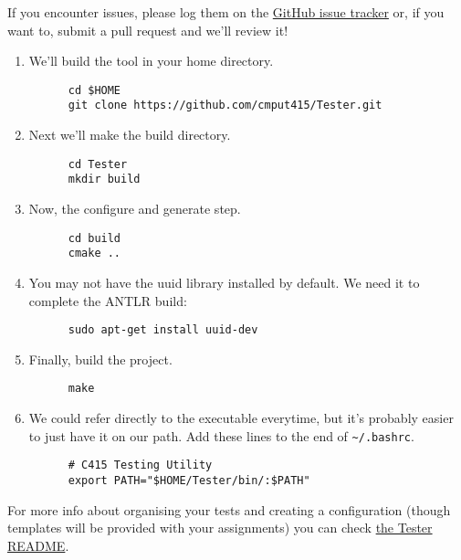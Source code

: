 \documentclass[../setup.tex]{subfiles}
\begin{document}
If you encounter issues, please log them on the \href{https://github.com/cmput415/Tester/issues}
{GitHub issue tracker} or, if you want to, submit a pull request and we'll review it!
\begin{enumerate}
  \item
    We'll build the tool in your home directory.
    \begin{lstlisting}
      cd $HOME
      git clone https://github.com/cmput415/Tester.git
    \end{lstlisting}
  \item
    Next we'll make the build directory.
    \begin{lstlisting}
      cd Tester
      mkdir build
    \end{lstlisting}
  \item
    Now, the configure and generate step.
    \begin{lstlisting}
      cd build
      cmake ..
    \end{lstlisting}
  \item
    You may not have the uuid library installed by default. We need it to complete the ANTLR build:
    \begin{lstlisting}
      sudo apt-get install uuid-dev
    \end{lstlisting}
  \item
    Finally, build the project.
    \begin{lstlisting}
      make
    \end{lstlisting}
  \item
    We could refer directly to the executable everytime, but it's probably easier to just have it
    on our path. Add these lines to the end of \lstinline{~/.bashrc}.
    \begin{lstlisting}
      # C415 Testing Utility
      export PATH="$HOME/Tester/bin/:$PATH"
    \end{lstlisting}
\end{enumerate}
For more info about organising your tests and creating a configuration (though templates will be
provided with your assignments) you can check
\href{https://github.com/cmput415/Tester/blob/master/README.md}{the Tester README}.
\end{document}
